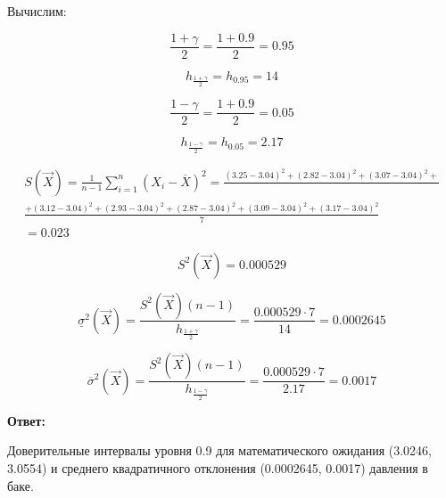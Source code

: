 \documentclass[a4paper,14pt]{extreport} %
\begin{document}
Вычислим:

$$\frac{1+\gamma}{2}=\frac{1+0.9}{2}=0.95$$

$$h_{\frac{1+\gamma}{2}}=h_{0.95}=14$$

$$\frac{1-\gamma}{2}=\frac{1+0.9}{2}=0.05$$

$$h_{\frac{1-\gamma}{2}}=h_{0.05}=2.17$$

\begin{multline*}
S(\vec X)=\frac{1}{n-1}\sum_{i=1}^n(X_i-\overline X)^2=\frac{(3.25-3.04)^2 +(2.82-3.04)^2 +(3.07-3.04)^2+}{}\\ \frac{+(3.12-3.04)^2 +(2.93-3.04)^2 +(2.87-3.04)^2 +(3.09-3.04)^2 +(3.17-3.04)^2 }{7}\\
=0.023
\end{multline*}

$$S^2(\vec X)=0.000529$$

$$\underline\sigma^2(\vec X)=\frac{S^2(\vec X)(n-1)}{h_{\frac{1+\gamma}{2}}}=\frac{0.000529\cdot 7}{14}=0.0002645$$

$$\overline\sigma^2(\vec X)=\frac{S^2(\vec X)(n-1)}{h_{\frac{1-\gamma}{2}}}=\frac{0.000529\cdot 7}{2.17}=0.0017$$

\textbf{Ответ:}

Доверительные интервалы уровня 0.9 для математического ожидания (3.0246, 3.0554) и среднего квадратичного отклонения (0.0002645, 0.0017) давления в баке.
\end{document}
